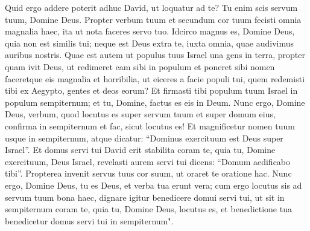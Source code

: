 \begin{biblechapter}
\verse Quid ergo addere poterit adhuc David, ut loquatur ad te? Tu enim scis servum tuum, Domine Deus. 
\verse Propter verbum tuum et secundum cor tuum fecisti omnia magnalia haec, ita ut nota faceres servo tuo. 
\verse Idcirco magnus es, Domine Deus, quia non est similis tui; neque est Deus extra te, iuxta omnia, quae audivimus auribus nostris. 
\verse Quae est autem ut populus tuus Israel una gens in terra, propter quam ivit Deus, ut redimeret eam sibi in populum et poneret sibi nomen faceretque eis magnalia et horribilia, ut eiceres a facie populi tui, quem redemisti tibi ex Aegypto, gentes et deos eorum? 
\verse Et firmasti tibi populum tuum Israel in populum sempiternum; et tu, Domine, factus es eis in Deum. 
\verse Nunc ergo, Domine Deus, verbum, quod locutus es super servum tuum et super domum eius, confirma in sempiternum et fac, sicut locutus es! 
\verse Et magnificetur nomen tuum usque in sempiternum, atque dicatur: “Dominus exercituum est Deus super Israel”. Et domus servi tui David erit stabilita coram te, 
\verse quia tu, Domine exercituum, Deus Israel, revelasti aurem servi tui dicens: “Domum aedificabo tibi”. Propterea invenit servus tuus cor suum, ut oraret te oratione hac. 
\verse Nunc ergo, Domine Deus, tu es Deus, et verba tua erunt vera; cum ergo locutus sis ad servum tuum bona haec, 
\verse dignare igitur benedicere domui servi tui, ut sit in sempiternum coram te, quia tu, Domine Deus, locutus es, et benedictione tua benedicetur domus servi tui in sempiternum". 
\end{biblechapter}

